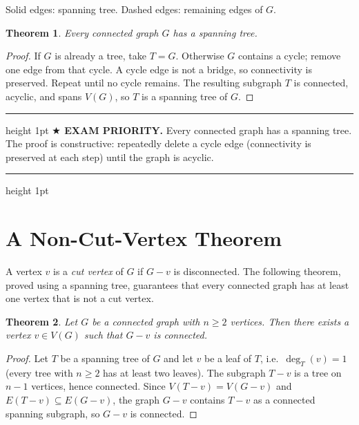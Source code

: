 \documentclass[11pt]{article}
\newtheorem{theorem}{Theorem}
\theoremstyle{definition}
\newenvironment{exambox}
  {\par\medskip\noindent\begin{center}\begin{minipage}{0.92\textwidth}%
   \hrule height 1pt \vspace{4pt}\noindent\textbf{$\bigstar$ EXAM PRIORITY.} }
  {\vspace{4pt}\hrule height 1pt \end{minipage}\end{center}\medskip}
\begin{document}
\begin{center}
\par\smallskip\small
Solid edges: spanning tree.  Dashed edges: remaining edges of $G$.
\end{center}

\begin{theorem}
Every connected graph $G$ has a spanning tree.
\end{theorem}

\begin{proof}
If $G$ is already a tree, take $T=G$.  Otherwise $G$ contains a cycle;
remove one edge from that cycle.  A cycle edge is not a bridge, so
connectivity is preserved.  Repeat until no cycle remains.  The resulting
subgraph $T$ is connected, acyclic, and spans $V(G)$, so $T$ is a spanning
tree of $G$.
\end{proof}

\begin{exambox}
Every connected graph has a spanning tree.  The proof is constructive:
repeatedly delete a cycle edge (connectivity is preserved at each step)
until the graph is acyclic.
\end{exambox}

\section*{A Non-Cut-Vertex Theorem}

A vertex $v$ is a \emph{cut vertex} of $G$ if $G-v$ is disconnected.  The
following theorem, proved using a spanning tree, guarantees that every
connected graph has at least one vertex that is not a cut vertex.

\begin{theorem}
Let $G$ be a connected graph with $n\geq 2$ vertices.  Then there exists a
vertex $v\in V(G)$ such that $G-v$ is connected.
\end{theorem}

\begin{proof}
Let $T$ be a spanning tree of $G$ and let $v$ be a leaf of $T$, i.e.\
$\deg_T(v)=1$ (every tree with $n\geq 2$ has at least two leaves).  The
subgraph $T-v$ is a tree on $n-1$ vertices, hence connected.  Since
$V(T-v)=V(G-v)$ and $E(T-v)\subseteq E(G-v)$, the graph $G-v$ contains
$T-v$ as a connected spanning subgraph, so $G-v$ is connected.
\end{proof}
\end{document}
